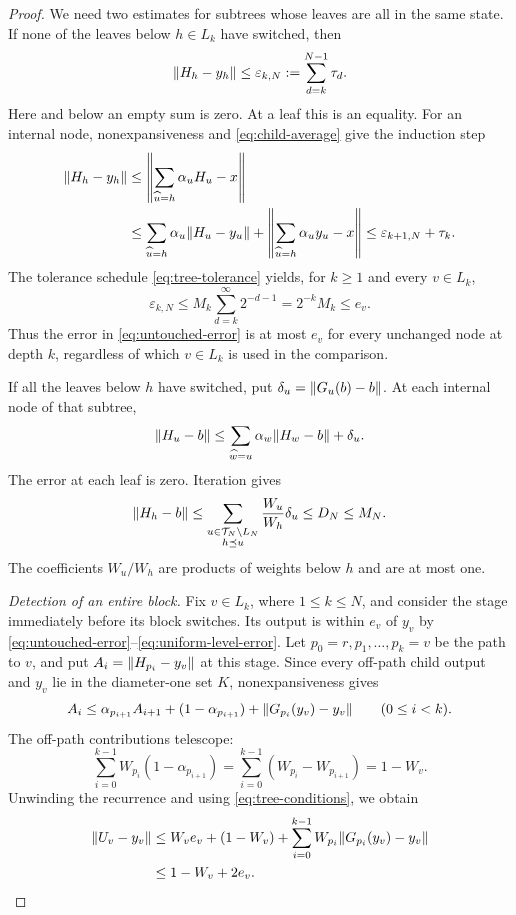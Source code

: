 \begin{proof}
We need two estimates for subtrees whose leaves are all in the same
state. If none of the leaves below $h\in L_k$ have switched, then
\begin{equation}
  \norm{H_h-y_h}
     \leq \varepsilon_{k,N}:=\sum_{d=k}^{N-1}\tau_d.
  \label{eq:untouched-error}
\end{equation}
Here and below an empty sum is zero. At a leaf this is an equality.
For an internal node, nonexpansiveness and \eqref{eq:child-average}
give the induction step
\begin{align*}
  \norm{H_h-y_h}
  &\leq
    \norm*{\sum_{\widehat u=h}\alpha_u H_u-x}\\
  &\leq
    \sum_{\widehat u=h}\alpha_u\norm{H_u-y_u}
       +\norm*{\sum_{\widehat u=h}\alpha_u y_u-x}
   \leq \varepsilon_{k+1,N}+\tau_k.
\end{align*}
The tolerance schedule \eqref{eq:tree-tolerance} yields, for $k\geq 1$
and every $v\in L_k$,
\begin{equation}
  \varepsilon_{k,N}
    \leq M_k\sum_{d=k}^{\infty}2^{-d-1}
    =2^{-k}M_k
    \leq e_v.
  \label{eq:uniform-level-error}
\end{equation}
Thus the error in \eqref{eq:untouched-error} is at most $e_v$ for every
unchanged node at depth $k$, regardless of which $v\in L_k$ is used in
the comparison.

If all the leaves below $h$ have switched, put
$\delta_u=\norm{G_u(b)-b}$. At each internal node of that subtree,
\[
  \norm{H_u-b}
    \leq \sum_{\widehat w=u}\alpha_w\norm{H_w-b}+\delta_u.
\]
The error at each leaf is zero. Iteration gives
\begin{equation}
  \norm{H_h-b}
    \leq
      \sum_{\substack{u\in\mathcal T_N\setminus L_N\\h\preceq u}}
           \frac{W_u}{W_h}\delta_u
    \leq D_N
    \leq M_N.
  \label{eq:transmitted-error}
\end{equation}
The coefficients $W_u/W_h$ are products of weights below $h$ and are
at most one.

\emph{Detection of an entire block.}
Fix $v\in L_k$, where $1\leq k\leq N$, and consider the stage immediately
before its block switches. Its output is within $e_v$ of $y_v$ by
\eqref{eq:untouched-error}--\eqref{eq:uniform-level-error}.
Let $p_0=r,p_1,\ldots,p_k=v$ be the path to $v$, and put
$A_i=\norm{H_{p_i}-y_v}$ at this stage. Since every off-path child output
and $y_v$ lie in the diameter-one set $K$, nonexpansiveness gives
\[
  A_i\leq
     \alpha_{p_{i+1}}A_{i+1}
       +(1-\alpha_{p_{i+1}})
       +\norm{G_{p_i}(y_v)-y_v}
       \qquad(0\leq i<k).
\]
The off-path contributions telescope:
\[
 \sum_{i=0}^{k-1}W_{p_i}(1-\alpha_{p_{i+1}})
 =\sum_{i=0}^{k-1}(W_{p_i}-W_{p_{i+1}})=1-W_v.
\]
Unwinding the recurrence and using \eqref{eq:tree-conditions}, we obtain
\begin{align}
  \norm{U_v-y_v}
   &\leq
      W_v e_v+(1-W_v)
       +\sum_{i=0}^{k-1}W_{p_i}\norm{G_{p_i}(y_v)-y_v}
       \notag\\
   &\leq 1-W_v+2e_v.
   \label{eq:before-block}
\end{align}


\end{proof}
